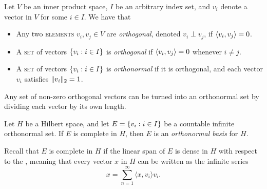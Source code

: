 \documentclass[../thesis.tex]{subfiles}
\begin{document}
\begin{definition}
    Let $V$ be an inner product space, $I$ be an arbitrary index set, and $v_i$ denote a vector in $V$ for some $i\in I$. We have that
    \begin{itemize}%
        \item Any two \textsc{elements} $v_i, v_j \in V$ are \emph{orthogonal}, denoted $v_i \perp v_j$, if $\langle v_i,v_j\rangle = 0$.
        \item A \textsc{set} of vectors $\{v_i : i \in I\}$ is \emph{orthogonal} if $\langle v_i,v_j\rangle = 0$ whenever $i\neq j$. %
        \item A \textsc{set} of vectors $\{v_i : i \in I\}$ is \emph{orthonormal} if it is orthogonal, and each vector $v_i$ satisfies $\|v_i\|_2 = 1$. %
        \qedhere
    \end{itemize}
\end{definition}
\begin{remark}
    Any set of non-zero orthogonal vectors can be turned into an orthonormal set by dividing each vector by its own length.
\end{remark}
\begin{definition}
    Let $H$ be a Hilbert space, and let $E = \{v_i : i \in I\}$ be a countable infinite orthonormal set. If $E$ is complete in $H$, then $E$ is an \emph{orthonormal basis} for $H$.
\end{definition}
Recall that $E$ is complete in $H$ if the linear span of $E$ is dense in $H$ with respect to the \GenNormH, meaning that every vector $x$ in $H$ can be written as the infinite series
\begin{equation*}%
    x= \sum_{n=1}^{\infty} \langle x, v_i \rangle v_i . %
\end{equation*}
\end{document}
